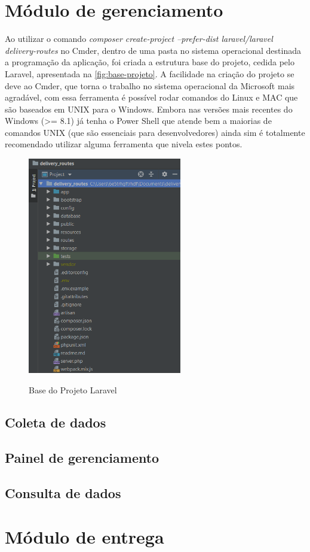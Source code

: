 \section{Módulo de gerenciamento}
Ao utilizar o comando \textit{composer create-project --prefer-dist laravel/laravel delivery-routes} no Cmder, dentro de uma pasta no sistema operacional destinada a programação da aplicação, foi criada a estrutura base do projeto, cedida pelo Laravel, apresentada na \autoref{fig:base-projeto}. A facilidade na criação do projeto se deve ao Cmder, que torna o trabalho no sistema operacional da Microsoft mais agradável, com essa ferramenta é possível rodar comandos do Linux e MAC que são baseados em UNIX para o Windows. Embora nas versões mais recentes do Windows (>= 8.1) já tenha o Power Shell que atende bem a maiorias de comandos UNIX (que são essenciais para desenvolvedores) ainda sim é totalmente recomendado utilizar alguma ferramenta que nivela estes pontos.

\begin{figure}[H]
    \centering
    \caption{Base do Projeto Laravel}
    \includegraphics[width=0.6\textwidth]{./dados/figuras/fig6}
    \label{fig:base-projeto}
\end{figure}

\subsection{Coleta de dados}

\subsection{Painel de gerenciamento}

\subsection{Consulta de dados}

\section{Módulo de entrega}